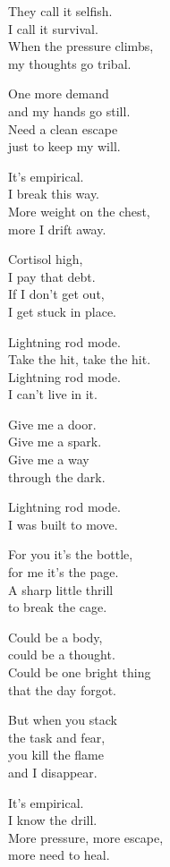\begin{lyrics}

They call it selfish.\\
I call it survival.\\
When the pressure climbs,\\
my thoughts go tribal.

One more demand\\
and my hands go still.\\
Need a clean escape\\
just to keep my will.

It’s empirical.\\
I break this way.\\
More weight on the chest,\\
more I drift away.

Cortisol high,\\
I pay that debt.\\
If I don’t get out,\\
I get stuck in place.

Lightning rod mode.\\
Take the hit, take the hit.\\
Lightning rod mode.\\
I can’t live in it.

Give me a door.\\
Give me a spark.\\
Give me a way\\
through the dark.

Lightning rod mode.\\
I was built to move.

For you it’s the bottle,\\
for me it’s the page.\\
A sharp little thrill\\
to break the cage.

Could be a body,\\
could be a thought.\\
Could be one bright thing\\
that the day forgot.

But when you stack\\
the task and fear,\\
you kill the flame\\
and I disappear.

It’s empirical.\\
I know the drill.\\
More pressure, more escape,\\
more need to heal.


\end{lyrics}
